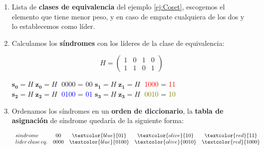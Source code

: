 \documentclass{beamer}
\theoremstyle{plain}
\theoremstyle{example}
\theoremstyle{example}
\begin{document}
\begin{frame}  \small  
\begin{enumerate} 



\item  Lista de \textbf{clases de equivalencia} del ejemplo \ref{ej:Coset}, escogemos el elemento que tiene menor peso, y en caso de empate cualquiera de los dos y lo establecemos como líder. 

\item Calculamos los \textbf{síndromes} con los líderes de la clase de equivalencia:


\[
   H=      \left( \begin{array}{cccc}
                  1 & 0 & 1 & 0\\
                  1 & 1 & 0 & 1 	  
           			\end{array}
    		\right) 	    		
\]
\begin{center}
$\mathbf{s_0} = H \;\mathbf{z_0} = H \;$ 0000 =  00 \hspace{0.2cm}
$\mathbf{s_1} = H \;\mathbf{z_1} = H \;$ \textcolor{red}{1000} =  \textcolor{red}{11}\\
$\mathbf{s_2} = H \;\mathbf{z_2} = H \;$ \textcolor{blue}{0100} =  \textcolor{blue}{01} \hspace{0.2cm}
$\mathbf{s_3} = H \;\mathbf{z_3} = H \;$ \textcolor{olive}{0010} =  \textcolor{olive}{10}

\end{center}

\item Ordenamos los síndromes en un \textbf{orden de diccionario}, la \textbf{tabla de asignación} de síndrome quedaría de la siguiente forma:


\[
  \begin{array}{lcccc}
                   sindrome & 00 & \textcolor{blue}{01} & \textcolor{olive}{10} & \textcolor{red}{11}\\ 
				   lider\, clase\, eq. & 0000 & \textcolor{blue}{0100} & \textcolor{olive}{0010} & \textcolor{red}{1000}
	\end{array}
\]
\end{enumerate} \end{frame} 
\end{document}
